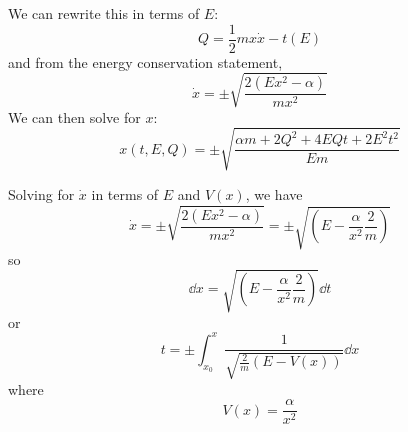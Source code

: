 \documentclass[a4paper,twoside]{article}
\begin{document}
\begin{problem}
    We can rewrite this in terms of $ E $:
    \begin{equation}
        Q = \frac{1}{2} mx\dot{x} - t\left( E \right)
    \end{equation}
    and from the energy conservation statement,
    \begin{equation}
        \dot{x} = \pm \sqrt{\frac{2(E x^2 - \alpha)}{m x^2}}
    \end{equation}
    We can then solve for $ x $:
    \begin{equation}
        x(t, E, Q) = \pm \sqrt{\frac{\alpha m + 2 Q^2 + 4 EQt + 2 E^2 t^2}{Em}}
    \end{equation}

    Solving for $ \dot{x} $ in terms of $ E $ and $ V(x) $, we have
    \begin{equation}
        \dot{x} = \pm \sqrt{\frac{2(E x^2 - \alpha)}{m x^2}} = \pm \sqrt{\left( E - \frac{\alpha}{x^2} \frac{2}{m} \right)}
    \end{equation}
    so
    \begin{equation}
        \dd{x} = \sqrt{\left( E - \frac{\alpha}{x^2} \frac{2}{m} \right)} \dd{t}
    \end{equation}
    or
    \begin{equation}
        t = \pm \int_{x_0}^x \frac{1}{\sqrt{\frac{2}{m} (E - V(x))}} \dd{x}
    \end{equation}
    where
    \begin{equation}
        V(x) = \frac{\alpha}{x^2}
    \end{equation}
\end{problem}
\end{document}
